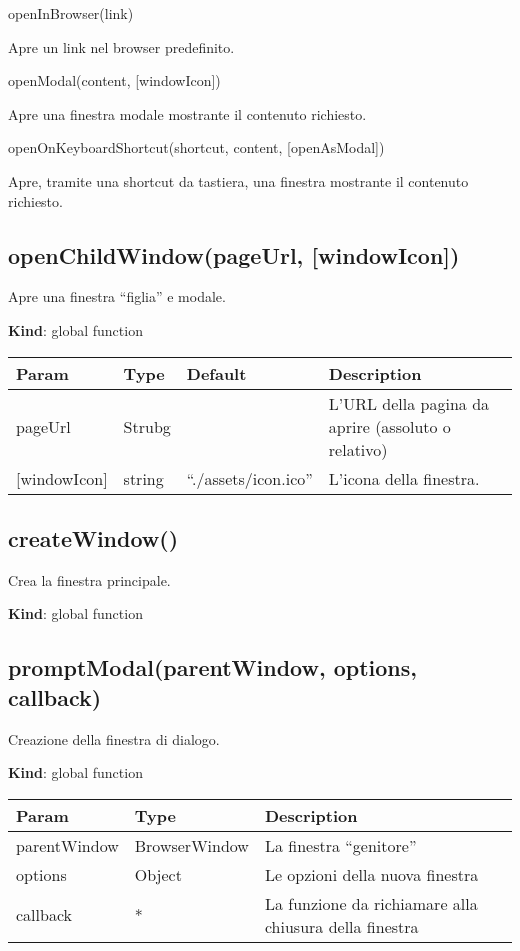 openInBrowser(link)

Apre un link nel browser predefinito.

openModal(content, {[}windowIcon{]})

Apre una finestra modale mostrante il contenuto richiesto.

openOnKeyboardShortcut(shortcut, content, {[}openAsModal{]})

Apre, tramite una shortcut da tastiera, una finestra mostrante il
contenuto richiesto.

\hypertarget{openchildwindowpageurl-windowicon}{%
\subsection{openChildWindow(pageUrl,
{[}windowIcon{]})}\label{openchildwindowpageurl-windowicon}}

Apre una finestra ``figlia'' e modale.

\textbf{Kind}: global function

\begin{longtable}[]{@{}llll@{}}
\toprule
Param & Type & Default & Description\tabularnewline
\midrule
\endhead
pageUrl & Strubg & & L'URL della pagina da aprire (assoluto o
relativo)\tabularnewline
{[}windowIcon{]} & string & ``./assets/icon.ico'' & L'icona della
finestra.\tabularnewline
\bottomrule
\end{longtable}

\hypertarget{createwindow}{%
\subsection{createWindow()}\label{createwindow}}

Crea la finestra principale.

\textbf{Kind}: global function\\

\hypertarget{promptmodalparentwindow-options-callback}{%
\subsection{promptModal(parentWindow, options,
callback)}\label{promptmodalparentwindow-options-callback}}

Creazione della finestra di dialogo.

\textbf{Kind}: global function

\begin{longtable}[]{@{}lll@{}}
\toprule
Param & Type & Description\tabularnewline
\midrule
\endhead
parentWindow & BrowserWindow & La finestra ``genitore''\tabularnewline
options & Object & Le opzioni della nuova finestra\tabularnewline
callback & * & La funzione da richiamare alla chiusura della
finestra\tabularnewline
\bottomrule
\end{longtable}

